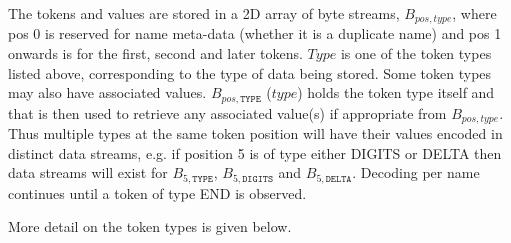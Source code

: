 \documentclass[a4paper]{article}
\begin{document}
The tokens and values are stored in a 2D array of byte streams,
$B_{pos,type}$, where pos 0 is reserved for name meta-data (whether it
is a duplicate name) and pos 1 onwards is for the first, second and
later tokens.  $Type$ is one of the token types listed above,
corresponding to the type of data being stored.  Some token types may
also have associated values.  $B_{pos,\texttt{TYPE}}$ ($type$) holds the token
type itself and that is then used to retrieve any associated
value(s) if appropriate from $B_{pos,type}$.  Thus multiple types at the same token
position will have their values encoded in distinct data streams,
e.g. if position 5 is of type either DIGITS or DELTA then data streams
will exist for $B_{5,\texttt{TYPE}}$, $B_{5,\texttt{DIGITS}}$ and $B_{5, \texttt{DELTA}}$.
Decoding per name continues until a token of type END is observed.

More detail on the token types is given below.
\end{document}
